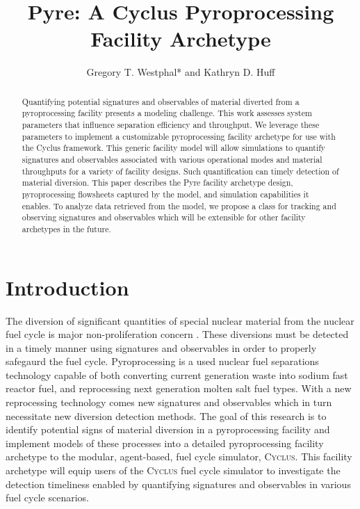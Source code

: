 \documentclass{anstrans}
\title{Pyre: A Cyclus Pyroprocessing Facility Archetype}
\author{Gregory T. Westphal* and Kathryn D. Huff}
\institute{
Dept. of Nuclear, Plasma and Radiological Engineering, University of Illinois at Urbana-Champaign \\
*gtw2@illinois.edu
}
\newcommand{\Cyclus}{\textsc{Cyclus}\xspace}%
\begin{document}
\begin{abstract}
Quantifying potential signatures and observables of material diverted from a 
pyroprocessing facility presents a modeling challenge.
This work assesses system parameters that influence separation efficiency and 
throughput. We leverage these parameters to implement a customizable pyroprocessing facility archetype for use with the Cyclus framework.
This generic facility model will allow simulations to 
quantify signatures and observables associated with various operational modes 
and material throughputs for a variety of facility designs. Such quantification 
can timely detection of material diversion. 
This paper describes the Pyre facility archetype design, pyroprocessing flowsheets captured by the model, and simulation capabilities it enables. 
To analyze data retrieved from the model, we propose a class for tracking and 
observing signatures and observables which will be extensible for other 
facility archetypes in the future.
\end{abstract}
\section{Introduction}
The diversion of significant quantities of special nuclear material from the nuclear fuel cycle is major non-proliferation 
concern \cite{noauthor_iaea_2017}. These diversions must be detected in a timely manner using signatures and observables in 
order to properly safegaurd the fuel cycle. Pyroprocessing is a used nuclear fuel separations technology capable of both 
converting current generation waste into sodium fast reactor fuel, and reprocessing next generation molten salt fuel types. 
With a new reprocessing technology comes new signatures and observables which in turn necessitate new diversion detection methods. 
The goal of this research is to identify potential signs of material diversion in a pyroprocessing facility and implement models 
of these processes into a detailed pyroprocessing facility archetype to the modular, agent-based, fuel cycle simulator, \Cyclus \cite{huff_fundamental_2016}. This facility archetype will equip users of the \Cyclus fuel cycle simulator to investigate the 
detection timeliness enabled by quantifying signatures and observables in various fuel cycle scenarios.
\end{document}
